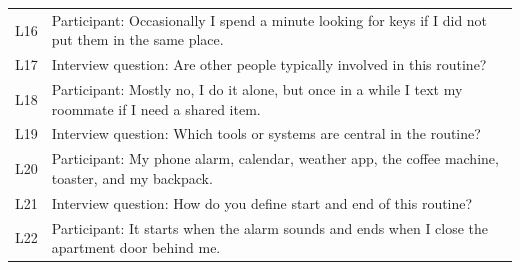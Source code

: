 \begin{table}[H]
\begin{tabularx}{\textwidth}{l X}
L16 & Participant: Occasionally I spend a minute looking for keys if I did not put them in the same place. \\
L17 & Interview question: Are other people typically involved in this routine? \\
L18 & Participant: Mostly no, I do it alone, but once in a while I text my roommate if I need a shared item. \\
L19 & Interview question: Which tools or systems are central in the routine? \\
L20 & Participant: My phone alarm, calendar, weather app, the coffee machine, toaster, and my backpack. \\
L21 & Interview question: How do you define start and end of this routine? \\
L22 & Participant: It starts when the alarm sounds and ends when I close the apartment door behind me. \\
\bottomrule
\end{tabularx}
\end{table}
